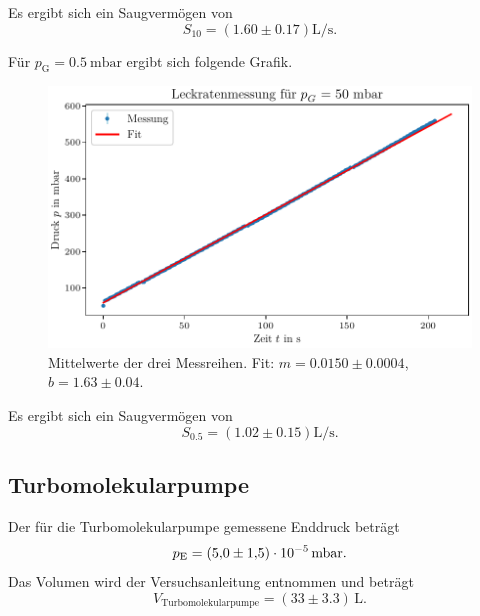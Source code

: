 Es ergibt sich ein Saugvermögen von
\begin{equation}
    S_{10} = (\num{1.60} \pm \num{0.17}) \si{\liter\per\second}.
\end{equation}

Für $p_\text{G} = \SI{0.5}{\milli\bar}$ ergibt sich folgende Grafik.

\begin{figure}[H]
    \centering
    \includegraphics[width=\textwidth]{plots/DP_Leck_50mbar.pdf}
    \caption{Mittelwerte der drei Messreihen. Fit: $m = \num{0.0150} \pm \num{0.0004}$, $b = \num{1.63} \pm \num{0.04}$.}
    \label{fig:DP_Leck_05mbar_mittelwert}
\end{figure}

Es ergibt sich ein Saugvermögen von
\begin{equation}
    S_{\num{0.5}} = (\num{1.02} \pm \num{0.15}) \si{\liter\per\second}.
\end{equation}

\subsection{Turbomolekularpumpe}

Der für die Turbomolekularpumpe gemessene Enddruck beträgt
\begin{equation}
    p_\text{E} = (\num{5.0} \pm \num{1.5}) \cdot 10^{-5} \, \si{\milli\bar}.\\
\end{equation}
Das Volumen wird der Versuchsanleitung entnommen und beträgt
\begin{equation}
    V_\text{Turbomolekularpumpe} = (\num{33} \pm \num{3.3}) \, \si{\liter}.
\end{equation}

